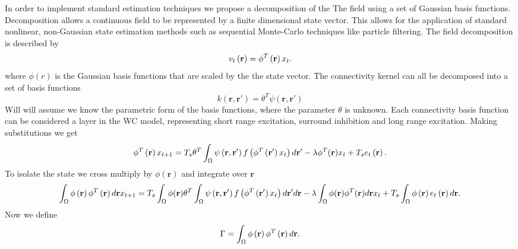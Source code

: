 \documentclass[onecolumn,draftcls]{IEEEtran}
\begin{document}
In order to implement standard estimation techniques we propose a decomposition of the The field using a set of Gaussian basis functions. Decomposition allows a continuous field to be represented by a finite dimensional state vector. This allows for the application of standard nonlinear, non-Gaussian state estimation methods such as sequential Monte-Carlo techniques like particle filtering. The field decomposition is described by
\begin{equation}\label{DefFieldDecomp}
{v_t}\left( {\bf{r}} \right) = {\phi ^T}\left( {\bf{r}} \right){x_t}.
\end{equation}
where $\phi(r)$ is the Gaussian basis functions that are scaled by the the state vector. The connectivity kernel can all be decomposed into a set of basis functions
\begin{equation}\label{DefKernelDecomp}
k( \mathbf{r} , \mathbf{r'} ) = \theta^T\psi(\mathbf{r} , \mathbf{r'} )
\end{equation}
Will will assume we know the parametric form of the basis functions, where the parameter $\theta$ is unknown. Each connectivity basis function can be considered a layer in the WC model, representing short range excitation, surround inhibition and long range excitation. Making substitutions we get
\begin{equation}\label{DecompModel}
{\phi ^T}\left( \mathbf{r} \right){x_{t+1}} = T_s\theta^T\int_\Omega  {\psi \left( {{\bf{r}} , {\mathbf{r'}}} \right)f\left( {{\phi ^T}\left( {{\mathbf{r'}}} \right){x_t}} \right)d{\mathbf{r'}}}  - \lambda\phi^T(\mathbf{r})x_t + T_s{e_t}\left( {\mathbf{r}} \right).
\end{equation}
To isolate the state we cross multiply by $\phi(\mathbf{r})$ and integrate over $\mathbf{r}$
\begin{equation}\label{Poo}
\int_\Omega  {\phi \left( {\bf{r}} \right){\phi ^T}\left( {\bf{r}} \right)d{\bf{r}}{x_{t+1}}}  = T_s\int_\Omega  {\phi ( \mathbf{r} )\theta^T\int_\Omega  {\psi \left( {{\bf{r}} , {\bf{r'}}} \right)f\left( {{\phi ^T}\left( {{\bf{r'}}} \right){x_t}} \right)d{\bf{r'}}} d{\bf{r}}}  - \lambda\int_\Omega \phi(\mathbf{r})\phi^T(\mathbf{r})d\mathbf{r} x_t  + T_s\int_\Omega  {\phi \left( {\mathbf{r}} \right)e_t\left( {\mathbf{r}} \right)d{\mathbf{r}}}.
\end{equation}
Now we define
\begin{equation}\label{DefGamma}
\Gamma  = \int_\Omega  {\phi \left( {\bf{r}} \right){\phi ^T}\left( {\bf{r}} \right)d{\bf{r}}}.
\end{equation}
\end{document}
